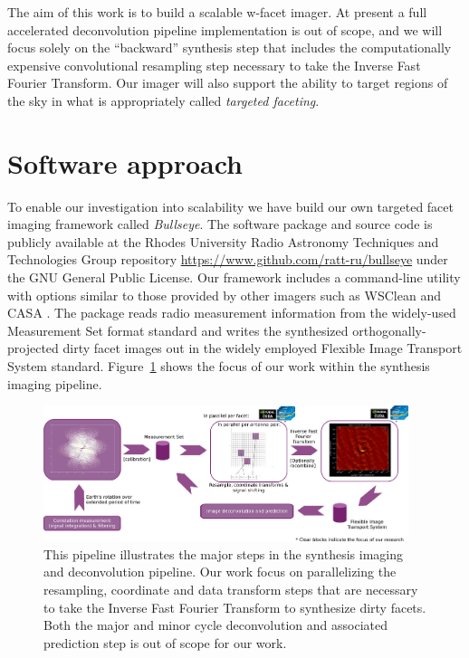 The aim of this work is to build a scalable w-facet imager. At present a full accelerated deconvolution pipeline implementation is out of scope, and we will focus solely on the ``backward'' synthesis step
that includes the computationally expensive convolutional resampling step necessary to take the Inverse Fast Fourier Transform. Our imager will also support the ability to target regions of the sky in what is
appropriately called \textit{targeted faceting}.

\section{Software approach}
To enable our investigation into scalability we have build our own targeted facet imaging framework called \textit{Bullseye}. The software package and source code is publicly available at the Rhodes University Radio Astronomy 
Techniques and Technologies Group repository \url{https://www.github.com/ratt-ru/bullseye} under the GNU General Public License. Our framework includes a command-line utility with options similar to those provided by other imagers such 
as WSClean \cite{offringa2014wsclean} and CASA \cite{jaeger2008common,mcmullin2007casa}. The package reads radio measurement information from the widely-used Measurement Set \cite{ms10,ms20} format standard and writes the synthesized 
orthogonally-projected dirty facet images out in the widely employed Flexible Image Transport System \cite{pence2010definition,calabretta2002representations} standard. Figure~\ref{fig_aims_pipeline} shows the focus of our work
within the synthesis imaging pipeline.
\begin{figure}
 \begin{mdframed}
  \centering
  \includegraphics[width=0.95\textwidth]{images/aims_process.png}
  \caption[Aims of the work in this thesis and position in synthesis pipeline.]{This pipeline illustrates the major steps in the synthesis imaging and deconvolution pipeline. Our work focus on parallelizing the resampling,
	  coordinate and data transform steps that are necessary to take the Inverse Fast Fourier Transform to synthesize dirty facets. Both the major and minor cycle deconvolution and associated prediction step is out of scope for our work.}
  \label{fig_aims_pipeline}
 \end{mdframed}
\end{figure}

